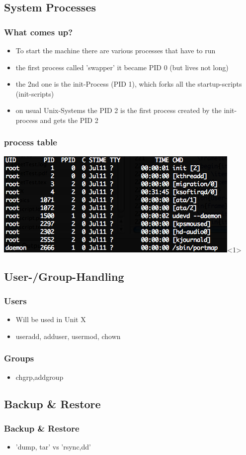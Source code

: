 \documentclass[hyperref={pdfpagelabels=false}]{beamer}
\begin{document}
    \subsection{System Processes}
	    \begin{frame}
			\frametitle{What comes up?}
			\begin{itemize}
                \item<1-> To start the machine there are various processes that have to run
                \item<1-> the first process called 'swapper' it became PID 0 (but lives not long)
                \item<2-> the 2nd one is the init-Process (PID 1), which forks all the startup-scripts (init-scripts)
                \item<3-> on usual Unix-Systems the PID 2 is the first process created by the init-process and gets the PID 2
            \end{itemize}
		\end{frame}
	    \begin{frame}
			\frametitle{process table}
			\includegraphics[height=0.4\columnwidth]{pics/ps.png}<1>%
		\end{frame}
    \subsection{User-/Group-Handling}
	    \begin{frame}
			\frametitle{Users}
			\begin{itemize}
                \item<2-> Will be used in Unit X
                \item<2-> useradd, adduser, usermod, chown
            \end{itemize}
		\end{frame}
	    \begin{frame}
			\frametitle{Groups}
			\begin{itemize}
                \item<2-> chgrp,addgroup
            \end{itemize}
		\end{frame}
    \subsection{Backup \& Restore}
	    \begin{frame}
			\frametitle{Backup \& Restore}
			\begin{itemize}
                \item<2-> 'dump, tar' vs 'rsync,dd'
            \end{itemize}
		\end{frame}
\end{document}
